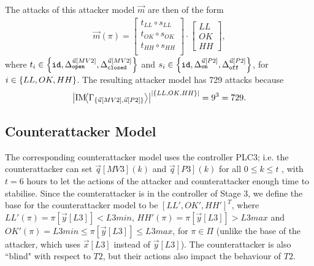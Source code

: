 {The attacks of this attacker model $\vec{m}$ are then of the form
\begin{align*}
  \vec{m}(\pi)=
  \begin{bmatrix}
    t_{LL}\circ s_{LL} \\
    t_{OK}\circ s_{OK} \\
    t_{HH}\circ s_{HH} \\
  \end{bmatrix}
  \cdot
  \begin{bmatrix}
    LL \\
    OK \\
    HH
  \end{bmatrix},
\end{align*} 
where $t_i\in \left\{{\texttt{id}},{\Delta}^{\vec{u}[MV2]}_{\texttt{open}}, {\Delta}^{\vec{u}[MV2]}_{\texttt{closed}}\right\}$ and  $s_i\in\left\{{\texttt{id}},{\Delta}^{\vec{u}[P2]}_{\texttt{on}}, {\Delta}^{\vec{u}[P2]}_{\texttt{off}}\right\}$, for $i\in \left\{LL,OK,HH\right\}$. The resulting attacker model has 729 attacks because
 \begin{align*}
  \left| \text{IM}\!{{\left<\Gamma_{\left\{\vec{u}[MV2],\vec{u}[P2]\right\}}\right>}}\right|^{\left|\left\{{LL},{OK},{HH}\right\}\right|}=9^3=729.
\end{align*}

\subsection{Counterattacker Model}
The corresponding counterattacker model uses the controller PLC3; i.e. the counterattacker can set $\vec{q}[MV3](k)$ and $\vec{q}[P3](k)$ for all $0\leq k\leq t$ , with  $t=6$ hours to let the actions of the attacker and counterattacker enough time to stabilise. Since the counterattacker is in the controller of Stage 3, we define the base for the counterattacker model to be $[LL', OK', HH']^T$, where ${LL'}(\pi)=\pi[\vec{y}[L3]]<L3min$, ${HH'}(\pi)=\pi[\vec{y}[L3]]>L3max$ and ${OK'}(\pi)=L3min \leq \pi[\vec{y}[L3]]\leq L3max$, for $\pi \in \Pi$ (unlike the base of the attacker, which uses $\vec{x}[L3]$ instead of $\vec{y}[L3]$). The counterattacker is also ``blind" with respect to $T2$, but their actions also impact the behaviour of $T2$. 

}
